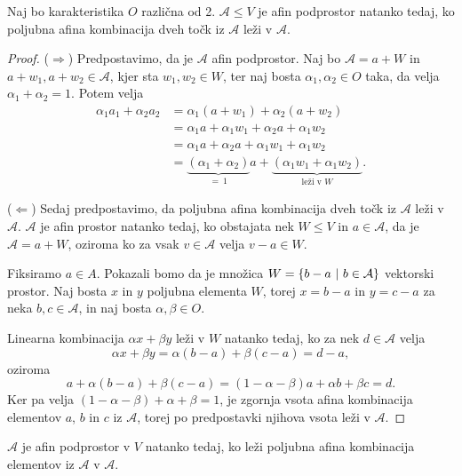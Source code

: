 \begin{trditev}
    Naj bo karakteristika $O$ različna od 2. $\mathcal{A} \leq V$ je afin podprostor natanko tedaj, ko poljubna afina kombinacija dveh točk iz $\mathcal{A}$ leži v $\mathcal{A}$.
\end{trditev}

\begin{proof}
    ($\Rightarrow$)
    Predpostavimo, da je $\mathcal{A}$ afin podprostor.
    Naj bo $\mathcal{A} = a + W$ in $a + w_1, a + w_2 \in \mathcal{A}$, kjer sta $w_1, w_2 \in W$, ter naj bosta $\alpha_1, \alpha_2 \in O$ taka, da velja $\alpha_1 + \alpha_2 = 1$. Potem velja
    \begin{align*}
    \alpha_1 a_1 + \alpha_2 a_2 &= \alpha_1 (a + w_1) + \alpha_2 (a + w_2) \\
    &= \alpha_1 a + \alpha_1 w_1 + \alpha_2 a + \alpha_1 w_2 \\
    &= \alpha_1 a + \alpha_2 a + \alpha_1 w_1 + \alpha_1 w_2 \\
    &= \underbrace{(\alpha_1 + \alpha_2)}_{=\: 1} a + \underbrace{(\alpha_1 w_1 + \alpha_1 w_2)}_{\text{leži v $W$}}.
    \end{align*}

    ($\Leftarrow$)
    Sedaj predpostavimo, da poljubna afina kombinacija dveh točk iz $\mathcal{A}$ leži v $\mathcal{A}$.
    $\mathcal{A}$ je afin prostor natanko tedaj, ko obstajata nek $W \leq V$ in $a \in \mathcal{A}$, da je $\mathcal{A} = a + W$, oziroma ko za vsak $v \in \mathcal{A}$ velja $v - a \in W$.
    
    Fiksiramo $a \in A$. Pokazali bomo da je množica $W = \left\{b-a~\middle\vert~b \in \mathcal{A}\right\}$ vektorski prostor.
    Naj bosta $x$ in $y$ poljubna elementa $W$, torej $x = b - a$ in $y = c - a$ za neka $b, c \in \mathcal{A}$, in naj bosta $\alpha, \beta \in O$.
    
    Linearna kombinacija $\alpha x + \beta y$ leži v $W$ natanko tedaj, ko za nek $d \in \mathcal{A}$ velja
    \[
    \alpha x + \beta y = \alpha (b - a) + \beta (c - a) = d - a,
    \]
    oziroma
    \[
    a + \alpha (b - a) + \beta (c - a) = (1 - \alpha - \beta) a + \alpha b + \beta c = d.
    \]
    Ker pa velja $(1 - \alpha - \beta) + \alpha + \beta = 1$, je zgornja vsota afina kombinacija elementov $a$, $b$ in $c$ iz $\mathcal{A}$, torej po predpostavki njihova vsota leži v $\mathcal{A}$.
\end{proof}


\begin{posledica}
    $\mathcal{A}$ je afin podprostor v $V$ natanko tedaj, ko leži poljubna afina kombinacija elementov iz $\mathcal{A}$ v $\mathcal{A}$.
\end{posledica}

